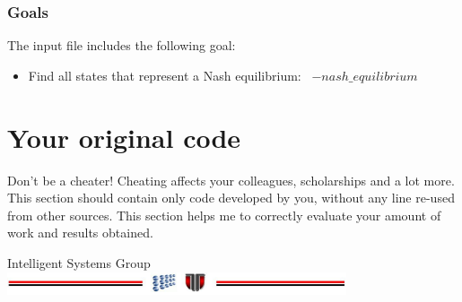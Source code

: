 \documentclass[a4paper,12pt]{report}
\begin{document}
\subsection{Goals}

The input file includes the following goal:

\begin{itemize}
\item Find all states that represent a Nash equilibrium: \
$-nash\_equilibrium$
\end{itemize}




\appendix

\chapter{Your original code}
Don't be a cheater! Cheating affects your colleagues, scholarships and a lot more.
This section should contain only code developed by you, without any line re-used from other sources. 
This section helps me to correctly evaluate your amount of work and results obtained. 


\vspace{2cm}
\begin{center}
Intelligent Systems Group\\
\includegraphics[width=10cm]{fig/footer}
\end{center}
\end{document}
